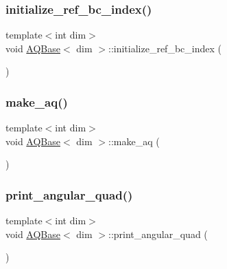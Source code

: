 \mbox{\label{class_a_q_base_aafde5b4c9ce19b1c6c4a8d37787f13b2}} 
\subsubsection{\texorpdfstring{initialize\+\_\+ref\+\_\+bc\+\_\+index()}{initialize\_ref\_bc\_index()}}
{\footnotesize\ttfamily template$<$int dim$>$ \\
void \hyperlink{class_a_q_base}{A\+Q\+Base}$<$ dim $>$\+::initialize\+\_\+ref\+\_\+bc\+\_\+index (\begin{DoxyParamCaption}{ }\end{DoxyParamCaption})\hspace{0.3cm}{\ttfamily [private]}}

\mbox{\label{class_a_q_base_ad8bf7c63bde67a2f514aea2c589983dd}} 
\subsubsection{\texorpdfstring{make\+\_\+aq()}{make\_aq()}}
{\footnotesize\ttfamily template$<$int dim$>$ \\
void \hyperlink{class_a_q_base}{A\+Q\+Base}$<$ dim $>$\+::make\+\_\+aq (\begin{DoxyParamCaption}{ }\end{DoxyParamCaption})}

\mbox{\label{class_a_q_base_adbe2961a0c0db888ca6a22ead08732eb}} 
\subsubsection{\texorpdfstring{print\+\_\+angular\+\_\+quad()}{print\_angular\_quad()}}
{\footnotesize\ttfamily template$<$int dim$>$ \\
void \hyperlink{class_a_q_base}{A\+Q\+Base}$<$ dim $>$\+::print\+\_\+angular\+\_\+quad (\begin{DoxyParamCaption}{ }\end{DoxyParamCaption})}

